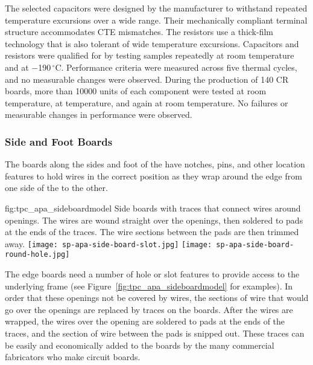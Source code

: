 The selected capacitors were designed by the manufacturer to withstand repeated temperature excursions over a wide range. Their mechanically compliant terminal structure accommodates CTE mismatches. The resistors use a thick-film technology that is also tolerant of wide temperature excursions.  Capacitors and resistors were qualified for  by testing samples repeatedly at room temperature and at \num{-190}\,$^\circ$C.  Performance criteria were measured across five thermal cycles, and no measurable changes were observed. During the production of \num{140} CR boards, more than \num{10000} units of each component were tested at room temperature, at \lar temperature, and again at room temperature. No failures or measurable changes in performance were observed.

\subsubsection{Side and Foot Boards}

The boards along the sides and foot of the  have notches, pins, and other location features to hold wires in the correct position as they wrap around the edge from one side of the  to the other.  

\begin{dunefigure}{fig:tpc_apa_sideboardmodel}
{Side boards with traces that connect wires around openings.  The wires are wound straight over the openings, then soldered to pads at the ends of the traces. The wire sections between the pads are then trimmed away.}
\texttt{[image: sp-apa-side-board-slot.jpg]} \quad
\texttt{[image: sp-apa-side-board-round-hole.jpg]}
\end{dunefigure}

The edge boards need a number of hole or slot features to provide access to the underlying frame (see Figure~\ref{fig:tpc_apa_sideboardmodel} for examples).  In order that these openings not be covered by wires, the sections of wire that would go over the openings are replaced by traces on the boards.  After the wires are wrapped, the wires over the opening are soldered to pads at the ends of the traces, and the section of wire between the pads is snipped out.  These traces can be easily and economically added to the boards by the many commercial fabricators who make circuit boards. 

